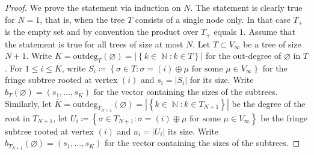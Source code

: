 \documentclass[11pt]{article}
\numberwithin{equation}{section}
\DeclareMathOperator{\N}{\mathbb{N}} %
\newcommand{\od}{\text{outdeg}}
\theoremstyle{definition}
\begin{document}
\begin{proof}
    We prove the statement via induction on $N$. The statement is clearly true for $N=1$, that is, when the tree $T$ consists of a single node only. In that case $T_+$ is the empty set and by convention the product over $T_+$ equals $1$. Assume that the statement is true for all trees of size at most $N$. Let $T \subset V_\infty$ be a tree of size $N+1$. Write $K= \od_T(\varnothing) = \left| \left\{ k \in \N : k\in T \right\} \right|$ for the out-degree of $\varnothing$ in $T$. For $1 \leq i \leq K$, write $S_i \coloneqq \left\{ \sigma \in T : \sigma=(i) \oplus \mu \text{ for some } \mu \in V_\infty \right\}$ for the fringe subtree rooted at vertex $(i)$ and $s_i = |S_i|$ for its size. Write $b_T(\varnothing) = (s_1,\ldots,s_K)$ for the vector containing the sizes of the subtrees. 
    Similarly, let $\overline{K}= \od_{T_{N+1}}(\varnothing) = \left| \left\{ k \in \N : k\in T_{N+1} \right\} \right|$ be the degree of the root in $T_{N+1}$, let
    $U_i \coloneqq \left\{ \sigma \in T_{N+1} : \sigma=(i)\oplus \mu \text{ for some } \mu \in V_\infty \right\}$ be the fringe subtree rooted at vertex $(i)$ and $u_i = |U_i|$ its size. Write $b_{T_{N+1}}(\varnothing) = (s_1,\ldots,s_K)$ for the vector containing the sizes of the subtrees. 


\end{proof}
\end{document}
